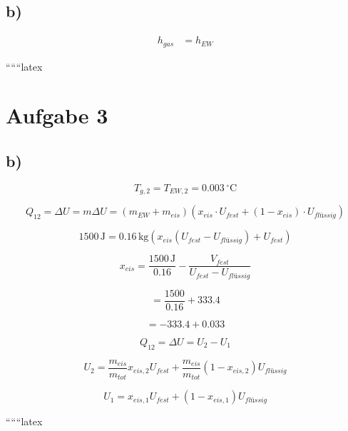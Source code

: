 

\subsection*{b)}

\begin{align*}
h_{gas} &= h_{EW}
\end{align*}

``````latex


\section*{Aufgabe 3}



\subsection*{b)}

\[
T_{g,2} = T_{EW,2} = 0.003 \, ^\circ \text{C}
\]

\[
Q_{12} = \Delta U = m \Delta U = (m_{EW} + m_{eis}) \left( x_{eis} \cdot U_{fest} + (1 - x_{eis}) \cdot U_{flüssig} \right)
\]

\[
1500 \, \text{J} = 0.16 \, \text{kg} \left( x_{eis} (U_{fest} - U_{flüssig}) + U_{fest} \right)
\]

\[
x_{eis} = \frac{1500 \, \text{J}}{0.16} - \frac{V_{fest}}{U_{fest} - U_{flüssig}}
\]

\[
= \frac{1500}{0.16} + 333.4
\]

\[
= -333.4 + 0.033
\]

\[
Q_{12} = \Delta U = U_2 - U_1
\]

\[
U_2 = \frac{m_{eis}}{m_{tot}} x_{eis,2} U_{fest} + \frac{m_{eis}}{m_{tot}} (1 - x_{eis,2}) U_{flüssig}
\]

\[
U_1 = x_{eis,1} U_{fest} + (1 - x_{eis,1}) U_{flüssig}
\]

``````latex